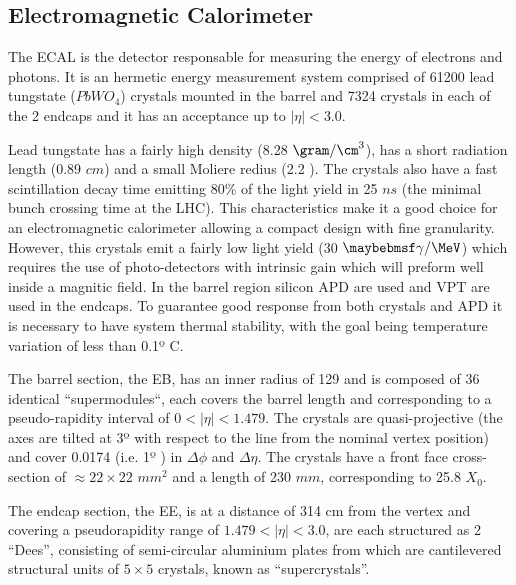 \subsection{Electromagnetic Calorimeter}
\label{SUBSECTION:ExperimentalApparatus_CMS_ECAL}


The \gls{ECAL} is the detector responsable for measuring the energy of electrons and photons. It is an hermetic energy measurement system comprised of 61200 lead tungstate ($PbWO_4$) crystals mounted in the barrel and 7324 crystals in each of the 2 endcaps and it has an acceptance up to $|\eta|<3.0$.

Lead tungstate has a fairly high density (8.28  $\gram/\cm^3$), has a short radiation length (0.89 $cm$) and a small Moliere redius (2.2 \cm). The crystals also have a fast scintillation decay time emitting 80\% of the light yield in 25 $ns$ (the minimal bunch crossing time at the LHC). This characteristics make it a good choice for an electromagnetic calorimeter allowing a compact design with fine granularity. However, this crystals emit a fairly low light yield (30 $\gamma/\MeV$) which requires the use of photo-detectors with intrinsic gain which will preform well inside a magnitic field. In the barrel region silicon \gls{APD} are used and \gls{VPT} are used in the endcaps. To guarantee good response from both crystals and \gls{APD} it is necessary to have system thermal stability, with the goal being temperature variation of less than 0.1º C.

The barrel section, the \gls{EB}, has an inner radius of 129 \cm and is composed of 36 identical ``supermodules``, each covers the barrel length and corresponding to a pseudo-rapidity interval of $0<|\eta|<1.479$. The crystals are quasi-projective (the axes are tilted at 3º with respect to the line from the nominal vertex position) and cover 0.0174 (i.e. 1º ) in $\Delta\phi$ and $\Delta\eta$. The crystals have a front face cross-section of $\approx 22\times22$ $mm^2$ and a length of 230 $mm$, corresponding to 25.8 $X_0$.

The endcap section, the \gls{EE}, is at a distance of 314 cm from the vertex and covering a pseudorapidity range of $1.479<|\eta|<3.0$, are each structured as 2 “Dees”, consisting of semi-circular aluminium plates from which are cantilevered structural units of $5\times5$ crystals, known as “supercrystals”.

